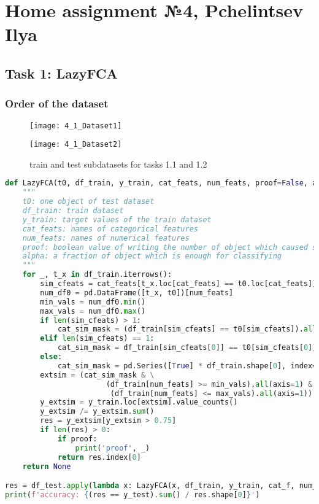 \section{Home assignment №4, Pchelintsev Ilya}

\subsection{Task 1: LazyFCA}

\subsubsection{Order of the dataset}

\begin{figure}[h]
\centering
\begin{minipage}{0.45\textwidth}
\texttt{[image: 4\_1\_Dataset1]}
\end{minipage}
\hfill
\begin{minipage}{0.45\textwidth}
\texttt{[image: 4\_1\_Dataset2]}
\end{minipage}
\caption{train and test subdatasets for tasks 1.1 and 1.2}
\end{figure}

\begin{lstlisting}[language=Python, caption=LazyFCA algorithm]
def LazyFCA(t0, df_train, y_train, cat_feats, num_feats, proof=False, alpha=0.75):
    """
    t0: one object of test dataset
    df_train: train dataset
    y_train: target values of the train dataset
    cat_feats: names of categorical features
    num_feats: names of numerical features
    proof: boolean value of writing the number of object which caused succesfull classification
    alpha: a fraction of object which is enough for classifying
    """
    for _, t_x in df_train.iterrows():
        sim_cfeats = cat_feats[t_x.loc[cat_feats] == t0.loc[cat_feats]]
        num_df0 = pd.DataFrame([t_x, t0])[num_feats]
        min_vals = num_df0.min()
        max_vals = num_df0.max()
        if len(sim_cfeats) > 1:
            cat_sim_mask = (df_train[sim_cfeats] == t0[sim_cfeats]).all(axis=1)
        elif len(sim_cfeats) == 1:
            cat_sim_mask = df_train[sim_cfeats[0]] == t0[sim_cfeats[0]]
        else:
            cat_sim_mask = pd.Series([True] * df_train.shape[0], index=df_train.index)
        extsim = (cat_sim_mask & \
                       (df_train[num_feats] >= min_vals).all(axis=1) & \
                        (df_train[num_feats] <= max_vals).all(axis=1))
        y_extsim = y_train.loc[extsim].value_counts()
        y_extsim /= y_extsim.sum()
        res = y_extsim[y_extsim > 0.75]
        if len(res) > 0:
            if proof:
                print('proof', _)
            return res.index[0]
    return None

res = df_test.apply(lambda x: LazyFCA(x, df_train, y_train, cat_f, num_f, True), axis=1)
print(f'accuracy: {(res == y_test).sum() / res.shape[0]}')
\end{lstlisting}

